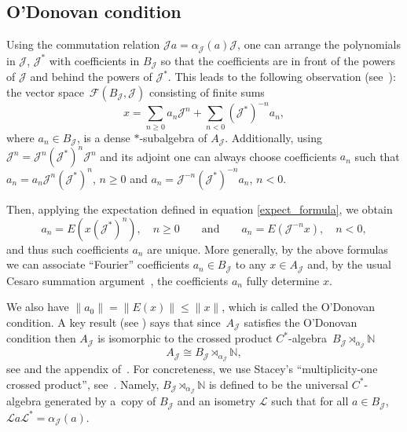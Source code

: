 \documentclass[10pt,a4paper]{amsart}
\newcommand{\N}{{\mathbb N}}
\newcommand{\jcal}{{\mathcal J}}
\newcommand{\fancyJ}{\mathcal{J}}
\newcommand{\fancyL}{\mathcal{L}}
\numberwithin{equation}{section}
\begin{document}
\subsection{O'Donovan condition}
Using the commutation relation
${\mathcal{J}} a=\alpha_\jcal(a){\mathcal{J}}$,
one can arrange the polynomials in ${\mathcal{J}}$, ${\mathcal{J}}^*$ with coefficients in $B_\jcal$ so that the coefficients are in front of the powers of ${\mathcal{J}}$ and behind the powers of ${\mathcal{J}}^*$. This leads to the following observation (see~\cite[Proposition~2.3]{LO}):
the vector space~$\mathcal{F}(B_\jcal,{\mathcal{J}})$ consisting of finite sums
\begin{equation}\label{FourierV}
x=\sum_{n\ge0}a_n {\mathcal{J}}^n + \sum_{n<0}({\mathcal{J}}^*)^{-n} a_n ,
\end{equation}
where $a_n\in B_\jcal$, is a dense $*$-subalgebra of $A_{\mathcal{J}}$.
Additionally, using ${\mathcal{J}}^n = {\mathcal{J}}^n({\mathcal{J}}^*)^n{\mathcal{J}}^n$ and its adjoint
one can always choose coefficients $a_n$ such that
$
a_n=a_n{\mathcal{J}}^n({\mathcal{J}}^*)^n$, $ n\geq 0 $ and $ a_n={\mathcal{J}}^{-n}({\mathcal{J}}^*)^{-n}a_n$, $ n<0$.

Then, applying the expectation defined in equation \eqref{expect_formula}, we obtain
\begin{equation}\label{ancoeff}
a_n=E(x({\mathcal{J}}^*)^n) ,\quad n\geq 0\qquad \textrm{and}\qquad a_n=E({\mathcal{J}}^{-n}x),\quad n<0,
\end{equation}
and thus such coefficients $a_n$ are unique. More generally, by the above formulas we can associate ``Fourier'' coefficients $a_n\in B_\jcal$ to any $x\in A_\jcal$ and, by the usual Cesaro summation argument~\cite{K}, the coefficients $a_n$ fully determine $x$.

We also have
$\|a_0\|=\|E(x)\|\leq \|x\|$,
which is called the O'Donovan condition.
A key result (see \cite[Theorem~2.7]{LO}) says that since~$A_{\mathcal{J}}$ satisfies the O'Donovan condition then $A_{\mathcal{J}}$ is isomorphic to the crossed product $C^*$-algebra~${B_\jcal\rtimes_{\alpha_\jcal}\N}$
\begin{equation}\label{AJCross}
A_{\mathcal{J}}\cong B_\jcal\rtimes_{\alpha_\jcal}\N,
\end{equation}
see \cite{BKR} and the appendix of~\cite{HKMP2}. For concreteness, we use Stacey's ``multiplicity-one crossed product'', see~\cite{BKR}. Namely,
$B_\fancyJ \rtimes_{\alpha_\fancyJ} \N$ is defined to be the universal $C^*$-algebra generated by a~copy of $B_\fancyJ$ and an isometry $\fancyL$ such that for all $a\in B_\fancyJ$,
$
\fancyL a \fancyL^* = \alpha_\fancyJ(a)$.
\end{document}
